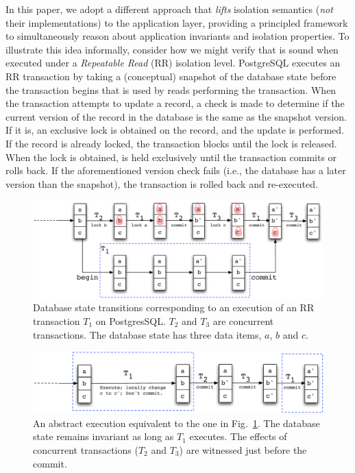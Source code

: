 In this paper, we adopt a different approach that \emph{lifts}
isolation semantics (\emph{not} their implementations) to the
application layer, providing a principled framework to simultaneously
reason about application invariants and isolation properties.  To
illustrate this idea informally, consider how we might verify that
 is sound when executed under a \emph{Repeatable Read}
(RR) isolation level.  PostgreSQL executes an RR transaction by taking
a (conceptual) snapshot of the database state before the transaction
begins that is used by reads performing the transaction.  When the
transaction attempts to update a record, a check is made to determine
if the current version of the record in the database is the same as the
snapshot version. If it is, an exclusive lock is obtained on the
record, and the update is performed. If the record is already locked,
the transaction blocks until the lock is released.  When the lock is
obtained, is held exclusively until the transaction commits or rolls
back. If the aforementioned version check fails (i.e., the database
has a later version than the snapshot), the transaction is rolled back
and re-executed.

\begin{figure}[t]
\includegraphics[scale=0.5]{Figures/RR-postgres}
\caption{Database state transitions corresponding to an execution of
  an RR transaction $T_1$ on PostgresSQL. $T_2$ and $T_3$ are concurrent
  transactions. The database state has three data items, $a$, $b$ and $c$. }
\label{fig:rr-postgres}
\end{figure}
\begin{figure}[t]
\includegraphics[scale=0.5]{Figures/RR-abstract}
  \caption{An abstract execution equivalent to the one in
  Fig.~\ref{fig:rr-postgres}. The database state remains invariant as long as
  $T_1$ executes. The effects of concurrent transactions ($T_2$ and
  $T_3$) are witnessed just before the commit.}
\label{fig:rr-abstract}
\end{figure}

